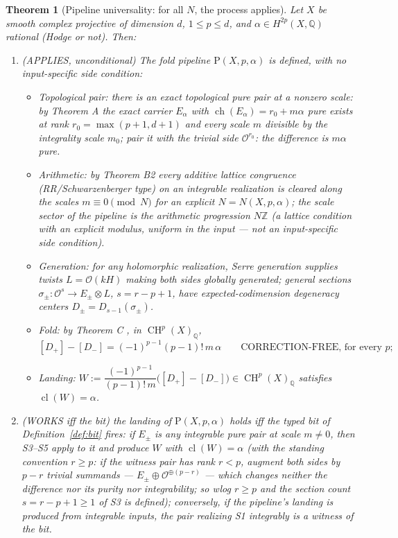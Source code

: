\documentclass[11pt]{article}
\newtheorem{theorem}{Theorem}[section]
\newcommand{\ch}{\operatorname{ch}}
\newcommand{\cl}{\operatorname{cl}}
\newcommand{\CH}{\operatorname{CH}}
\newcommand{\Oo}{\mathcal{O}}
\newcommand{\tensor}{\otimes}
\newcommand{\Z}{\mathbb{Z}}
\newcommand{\Q}{\mathbb{Q}}
\begin{document}
\begin{theorem}[Pipeline universality: for all $N$, the process applies]
\label{thm:U}
Let $X$ be smooth complex projective of dimension $d$, $1\le p\le d$, and
$\alpha\in H^{2p}(X,\Q)$ rational (Hodge or not).  Then:
\begin{enumerate}
\item[\textup{(i)}] \textup{(APPLIES, unconditional)} The fold pipeline
$\mathrm P(X,p,\alpha)$ is defined, with no input-specific side condition:
\begin{itemize}
\item[\textup{S1}] \emph{Topological pair}: there is an exact topological
pure pair at a nonzero scale: by Theorem A \cite{GST-forcing-site} the exact
carrier $E_\alpha$ with $\ch(E_\alpha)=r_0+m\alpha$ pure exists at rank
$r_0=\max(p+1,d+1)$ and every scale $m$ divisible by the integrality scale
$m_0$; pair it with the trivial side $\Oo^{r_0}$: the difference is $m\alpha$
pure.
\item[\textup{S2}] \emph{Arithmetic}: by Theorem B2 \cite{GST-forcing-site}
every additive lattice congruence (RR/Schwarzenberger type) on an integrable
realization is cleared along the scales $m\equiv0 \pmod N$ for an explicit
$N=N(X,p,\alpha)$; the scale sector of the pipeline is the arithmetic
progression $N\Z$ (a lattice condition with an explicit modulus, uniform in
the input --- not an input-specific side condition).
\item[\textup{S3}] \emph{Generation}: for any holomorphic realization,
Serre generation supplies twists $L=\Oo(kH)$ making both sides globally
generated; general sections $\sigma_\pm\colon\Oo^{s}\to E_\pm\tensor L$,
$s=r-p+1$, have expected-codimension degeneracy centers
$D_\pm=D_{s-1}(\sigma_\pm)$.
\item[\textup{S4}] \emph{Fold}: by Theorem C \cite{GST-gr25}, in
$\CH^p(X)_\Q$,
\[
[D_+]-[D_-]=(-1)^{p-1}(p-1)!\,m\,\alpha
\qquad\text{CORRECTION-FREE, for every } p;
\]
\item[\textup{S5}] \emph{Landing}: $W:=\dfrac{(-1)^{p-1}}{(p-1)!\,m}
\bigl([D_+]-[D_-]\bigr)\in\CH^p(X)_\Q$ satisfies $\cl(W)=\alpha$.
\end{itemize}
\item[\textup{(ii)}] \textup{(WORKS iff the bit)} the landing of
$\mathrm P(X,p,\alpha)$ holds iff the typed bit of
Definition~\ref{def:bit} fires: if $E_\pm$ is any integrable pure pair at
scale $m\ne0$, then S3--S5 apply to it and produce $W$ with $\cl(W)=\alpha$
(with the standing convention $r\ge p$: if the witness pair has rank
$r<p$, augment both sides by $p-r$ trivial summands --- $E_\pm\oplus
\Oo^{\oplus(p-r)}$ --- which changes neither the difference nor its purity
nor integrability; so wlog $r\ge p$ and the section count $s=r-p+1\ge1$ of
S3 is defined); conversely, if the pipeline's landing is produced from
integrable inputs, the pair realizing S1 integrably is a witness of the bit.
\end{enumerate}
\end{theorem}
\end{document}
